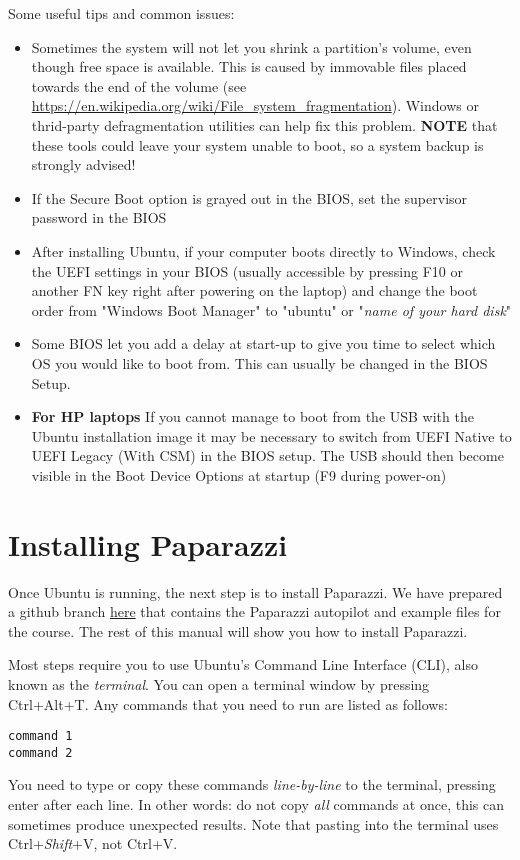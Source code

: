 \documentclass{article}
\begin{document}
Some useful tips and common issues:
\begin{itemize}
  \item Sometimes the system will not let you shrink a partition's volume, even though free space is available. This is caused by immovable files placed towards the end of the volume (see \url{https://en.wikipedia.org/wiki/File\_system\_fragmentation}). Windows or thrid-party defragmentation utilities can help fix this problem. \textbf{NOTE} that these tools could leave your system unable to boot, so a system backup is strongly advised!
  \item If the Secure Boot option is grayed out in the BIOS, set the supervisor password in the BIOS
  \item After installing Ubuntu, if your computer boots directly to Windows, check the UEFI settings in your BIOS (usually accessible by pressing F10 or another FN key right after powering on the laptop) and change the boot order from "Windows Boot Manager" to "ubuntu" or "\textit{name of your hard disk}"
  \item Some BIOS let you add a delay at start-up to give you time to select which OS you would like to boot from. This can usually be changed in the BIOS Setup.
  \item \textbf{For HP laptops} If you cannot manage to boot from the USB with the Ubuntu installation image it may be necessary to switch from UEFI Native to UEFI Legacy (With CSM) in the BIOS setup. The USB should then become visible in the Boot Device Options at startup (F9 during power-on)
\end{itemize}



\section{Installing Paparazzi}
Once Ubuntu is running, the next step is to install Paparazzi.
We have prepared a github branch \href{https://github.com/tudelft/paparazzi/tree/mavlabCourse2019}{here} that contains the Paparazzi autopilot and example files for the course. The rest of this manual will show you how to install Paparazzi.

Most steps require you to use Ubuntu's Command Line Interface (CLI), also known as the \emph{terminal}. You can open a terminal window by pressing Ctrl+Alt+T. Any commands that you need to run are listed as follows:
\begin{lstlisting}[style=Bash]
command 1
command 2
\end{lstlisting}
You need to type or copy these commands \emph{line-by-line} to the terminal, pressing enter after each line. In other words: do not copy \emph{all} commands at once, this can sometimes produce unexpected results. Note that pasting into the terminal uses Ctrl+\emph{Shift}+V, not Ctrl+V.
\end{document}

